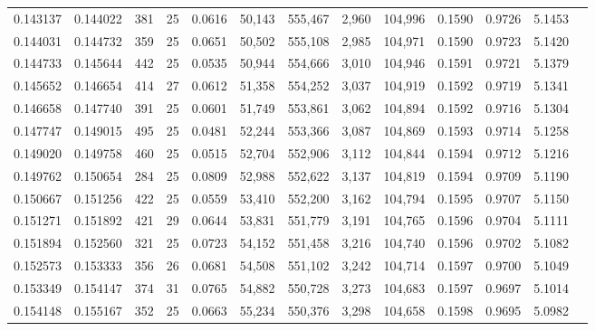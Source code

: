 \begin{tabular}{rrrrrrrrrrrrr}
0.143137 & 0.144022 &   381 &  25 &                                     0.0616 &  50,143 & 555,467 &   2,960 & 104,996 & 0.1590 & 0.9726 & 5.1453 \\
0.144031 & 0.144732 &   359 &  25 &                                     0.0651 &  50,502 & 555,108 &   2,985 & 104,971 & 0.1590 & 0.9723 & 5.1420 \\
0.144733 & 0.145644 &   442 &  25 &                                     0.0535 &  50,944 & 554,666 &   3,010 & 104,946 & 0.1591 & 0.9721 & 5.1379 \\
0.145652 & 0.146654 &   414 &  27 &                                     0.0612 &  51,358 & 554,252 &   3,037 & 104,919 & 0.1592 & 0.9719 & 5.1341 \\
0.146658 & 0.147740 &   391 &  25 &                                     0.0601 &  51,749 & 553,861 &   3,062 & 104,894 & 0.1592 & 0.9716 & 5.1304 \\
0.147747 & 0.149015 &   495 &  25 &                                     0.0481 &  52,244 & 553,366 &   3,087 & 104,869 & 0.1593 & 0.9714 & 5.1258 \\
0.149020 & 0.149758 &   460 &  25 &                                     0.0515 &  52,704 & 552,906 &   3,112 & 104,844 & 0.1594 & 0.9712 & 5.1216 \\
0.149762 & 0.150654 &   284 &  25 &                                     0.0809 &  52,988 & 552,622 &   3,137 & 104,819 & 0.1594 & 0.9709 & 5.1190 \\
0.150667 & 0.151256 &   422 &  25 &                                     0.0559 &  53,410 & 552,200 &   3,162 & 104,794 & 0.1595 & 0.9707 & 5.1150 \\
0.151271 & 0.151892 &   421 &  29 &                                     0.0644 &  53,831 & 551,779 &   3,191 & 104,765 & 0.1596 & 0.9704 & 5.1111 \\
0.151894 & 0.152560 &   321 &  25 &                                     0.0723 &  54,152 & 551,458 &   3,216 & 104,740 & 0.1596 & 0.9702 & 5.1082 \\
0.152573 & 0.153333 &   356 &  26 &                                     0.0681 &  54,508 & 551,102 &   3,242 & 104,714 & 0.1597 & 0.9700 & 5.1049 \\
0.153349 & 0.154147 &   374 &  31 &                                     0.0765 &  54,882 & 550,728 &   3,273 & 104,683 & 0.1597 & 0.9697 & 5.1014 \\
0.154148 & 0.155167 &   352 &  25 &                                     0.0663 &  55,234 & 550,376 &   3,298 & 104,658 & 0.1598 & 0.9695 & 5.0982 \\

\end{tabular}
